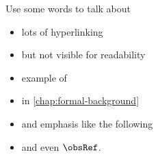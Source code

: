 
\dedication{\raggedleft\emph{To \_,\\
Something short and sweeet.}}



% 

\maketitle


\begingroup

  \let\cleardoublepage\clearpage




Use some words to talk about
\begin{itemize}
    \item lots of hyperlinking
    \item but not visible for readability
    \item example of 
    \item in \cref{chap:formal-background}
    \item and emphasis like the following 
    \item and even $\obsRef$.
\end{itemize}

